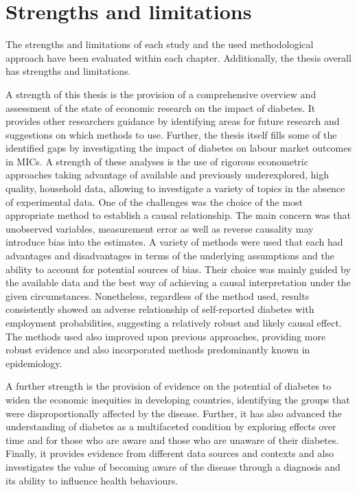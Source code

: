 \section{Strengths and limitations}

The strengths and limitations of each study and the used methodological approach have been evaluated within each chapter. Additionally, the thesis overall has strengths and limitations.


A strength of this thesis is the provision of a comprehensive overview and assessment of the state of economic research on the impact of diabetes. It provides other researchers guidance by identifying areas for future research and suggestions on which methods to use. Further, the thesis itself fills some of the identified gaps by investigating the impact of diabetes on labour market outcomes in \acp{MIC}. A strength of these analyses is the use of rigorous econometric approaches taking advantage of available and previously underexplored, high quality, household data, allowing to investigate a variety of topics in the absence of experimental data. One of the challenges was the choice of the most appropriate method to establish a causal relationship. The main concern was that unobserved variables, measurement error as well as reverse causality may introduce bias into the estimates. A variety of methods were used that each had advantages and disadvantages in terms of the underlying assumptions and the ability to account for potential sources of bias. Their choice was mainly guided by the available data and the best way of achieving a causal interpretation under the given circumstances. Nonetheless, regardless of the method used, results consistently showed an adverse relationship of self-reported diabetes with employment probabilities, suggesting a relatively robust and likely causal effect. The methods used also improved upon previous approaches, providing more robust evidence and also incorporated methods predominantly known in epidemiology. 

A further strength is the provision of evidence on the potential of diabetes to widen the economic inequities in developing countries, identifying the groups that were disproportionally affected by the disease. Further, it has also advanced the understanding of diabetes as a multifaceted condition by exploring effects over time and for those who are aware and those who are unaware of their diabetes. Finally, it provides evidence from different data sources and contexts and also investigates the value of becoming aware of the disease through a diagnosis and its ability to influence health behaviours.

